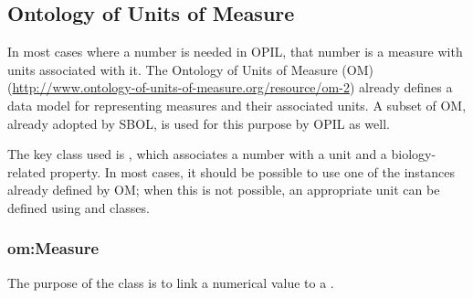 \subsection{Ontology of Units of Measure}

In most cases where a number is needed in OPIL, that number is a measure with units associated with it.
The Ontology of Units of Measure (OM) (\url{http://www.ontology-of-units-of-measure.org/resource/om-2}) already defines a data model for representing measures and their associated units. 
A subset of OM, already adopted by SBOL, is used for this purpose by OPIL as well.

The key class used is , which associates a number with a unit and a biology-related property.
In most cases, it should be possible to use one of the  instances already defined by OM; when this is not possible, an appropriate unit can be defined using  and  classes.

\subsubsection{om:Measure} \label{sec:om:Measure}

The purpose of the  class is to link a numerical value to a . 

